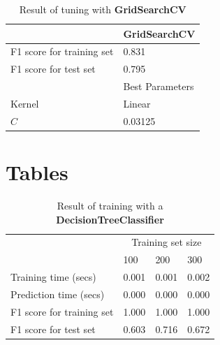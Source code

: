 \documentclass[twoside,openright,titlepage,numbers=noenddot,headinclude,%
               footinclude=true,cleardoublepage=empty,abstractoff,BCOR=5mm,%
               paper=a4,fontsize=11pt,ngerman,american]{scrreprt}
\numberwithin{theorem}{chapter}
\numberwithin{definition}{chapter}
\numberwithin{algorithm}{chapter}
\numberwithin{figure}{chapter}
\numberwithin{table}{chapter}
\numberwithin{equation}{chapter}
\begin{document}
\setlength{\extrarowheight}{1.5pt}
\begin{table}[!htbp]
\caption{Result of tuning with \textbf{GridSearchCV}} %
\centering %
\begin{tabular}{|p{4cm}||p{4cm}|} %
\hline %
& GridSearchCV\\[0.5ex]
\hline %

F1 score for training set     &0.831\\
F1 score for test set         &0.795\\

\hline %
& Best Parameters \\[1ex]
\hline %

Kernel & Linear\\
$C$ & 0.03125\\
\hline %
\end{tabular}
\label{tunedGridSearch}
\end{table}









\section*{Tables}

\setlength{\extrarowheight}{1.5pt}
\begin{table}[!htbp]
\caption{Result of training with a \textbf{DecisionTreeClassifier}} %
\centering %
\begin{tabular}{|p{6cm}|p{1.5cm}|p{1.5cm}|p{1.5cm}|} %
\hline %
& \multicolumn{3}{c|}{Training set size}\\[5pt]
\cline{2-4} 
& 100 & 200 & 300\\[0.5ex]
\hline %

Training time (secs)          &  0.001&  0.001&  0.002\\ 
Prediction time (secs)        &  0.000&  0.000&  0.000\\ 
F1 score for training set     &  1.000&  1.000&  1.000\\ 
F1 score for test set         &  0.603&  0.716&  0.672\\

\hline %
\end{tabular}
\label{decisionTreeTable}
\end{table}
\end{document}
